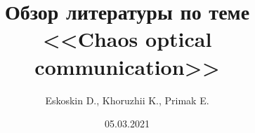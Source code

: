 \documentclass{beamer}
\title[Optical chaos]{Обзор литературы по теме \\ <<Chaos optical communication>>}
\author{Eskoskin D., Khoruzhii K., Primak E.}
\institute[MIPT]
\begin{document}
\date{05.03.2021}
\maketitle

% 




\end{document}
